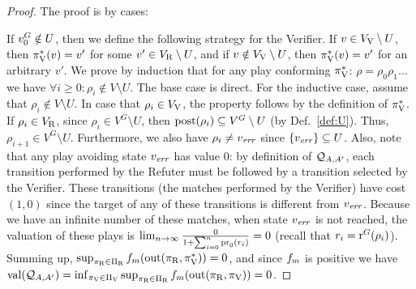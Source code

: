 \begin{proof} The proof is by cases:
	
	If $v_0^G \notin U$, then we define the following strategy for the Verifier. If $v \in V_{\mathrm{V}} \setminus U$, then $\pi^*_{\mathrm{V}}(v)=v'$ 
	for some $v' \in V_{\mathrm{R}} \setminus U$, and if $v \notin  V_{\mathrm{V}} \setminus U$, then $\pi^*_{\mathrm{V}}(v) = v'$ for an arbitrary $v'$. 
	We prove by induction that for any play conforming $\pi^*_{\mathrm{V}}$: $\rho =\rho_0 \rho_1 \dots$ we 
have $\forall i \geq 0: \rho_i \notin V \setminus U$. The base case is direct. 
For the inductive case, assume that $\rho_i \notin V \setminus U$. In case that $\rho_i \in V_{\mathrm{V}}$, the property follows by the definition of
$\pi^*_{\mathrm{V}}$. If $\rho_i \in V_{\mathrm{R}}$, since $\rho_i \in V^G \setminus U$, then $\operatorname{post}(\rho_i) \subseteq V^G \setminus U$ (by Def.~\ref{def:U}). 
Thus, $\rho_{i+1} \in V^G \setminus U$. 
	 Furthermore, we also have $\rho_i \neq v_{\mathit{err}}$ since $\{ v_{\mathit{err}} \} \subseteq U$. Also, note that any play avoiding state $v_{\mathit{err}}$ has value $0$: by definition of $\mathcal{Q}_{A, A'}$, each transition performed by the Refuter  must be followed by a transition
selected by the Verifier. These transitions (the matches performed by the Verifier) have cost $(1,0)$ since the target of any of these transitions is different from $v_{\mathit{err}}$. Because we have an infinite number of these matches, when state $v_{\mathit{err}}$ is not reached, the valuation 
of these plays is $\lim_{n\rightarrow \infty} \frac{0}{1+ \sum^n_{i=0} \operatorname{pr}_{0}(r_i)} = 0$ (recall that $r_i = \operatorname{r}^G(\rho_i)$). 
Summing up, $\sup_{\pi_{\mathrm{R}} \in \Pi_{\mathrm{R}}} f_{m}(\operatorname{out}(\pi_{\mathrm{R}}, \pi^*_{\mathrm{V}})) = 0$, and since $f_{m}$ is positive
we have $\operatorname{val}(\mathcal{Q}_{A, A'}) = \inf_{\pi_{\mathrm{V}} \in \Pi_{\mathrm{V}}} \sup_{\pi_{\mathrm{R}} \in \Pi_{\mathrm{R}}} f_{m}(\operatorname{out}(\pi_{\mathrm{R}}, \pi_{\mathrm{V}})) = 0$.


\end{proof}
